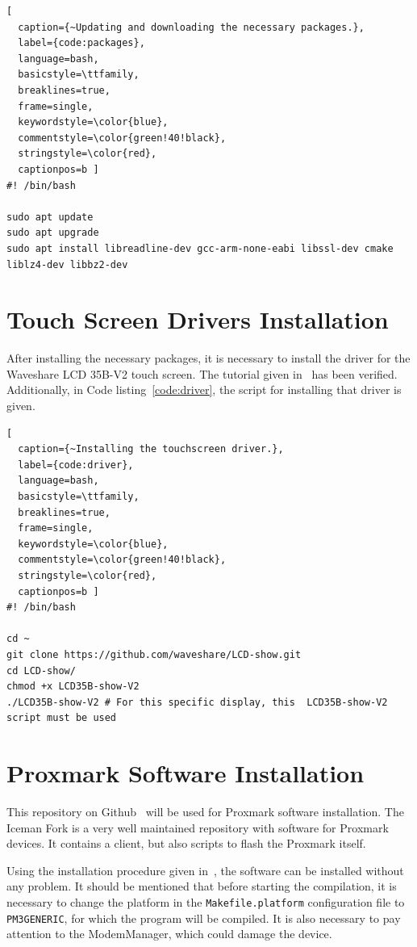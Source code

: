 \begin{lstlisting}[
  caption={~Updating and downloading the necessary packages.},
  label={code:packages},
  language=bash,
  basicstyle=\ttfamily,
  breaklines=true,
  frame=single, 
  keywordstyle=\color{blue},
  commentstyle=\color{green!40!black}, 
  stringstyle=\color{red},
  captionpos=b ]
#! /bin/bash

sudo apt update
sudo apt upgrade
sudo apt install libreadline-dev gcc-arm-none-eabi libssl-dev cmake liblz4-dev libbz2-dev
\end{lstlisting}


\section{Touch Screen Drivers Installation}

After installing the necessary packages, it is necessary to install the driver for the Waveshare LCD 35B-V2 touch screen. The tutorial given in~\cite{waveshare35inch} has been verified. Additionally, in Code listing~\ref{code:driver}, the script for installing that driver is given.

\begin{lstlisting}[
  caption={~Installing the touchscreen driver.},
  label={code:driver},
  language=bash,
  basicstyle=\ttfamily,
  breaklines=true,
  frame=single, 
  keywordstyle=\color{blue},
  commentstyle=\color{green!40!black}, 
  stringstyle=\color{red},
  captionpos=b ]
#! /bin/bash

cd ~
git clone https://github.com/waveshare/LCD-show.git
cd LCD-show/
chmod +x LCD35B-show-V2
./LCD35B-show-V2 # For this specific display, this  LCD35B-show-V2 script must be used
\end{lstlisting}

\section{Proxmark Software Installation}

This repository on Github~\cite{githubproxmark} will be used for Proxmark software installation. The Iceman Fork is a very well maintained repository with software for Proxmark devices. It contains a client, but also scripts to flash the Proxmark itself.

Using the installation procedure given in~\cite{githubproxmarkdoc}, the software can be installed without any problem. It should be mentioned that before starting the compilation, it is necessary to change the platform in the \texttt{Makefile.platform} configuration file to \texttt{PM3GENERIC}, for which the program will be compiled. It is also necessary to pay attention to the ModemManager, which could damage the device.

